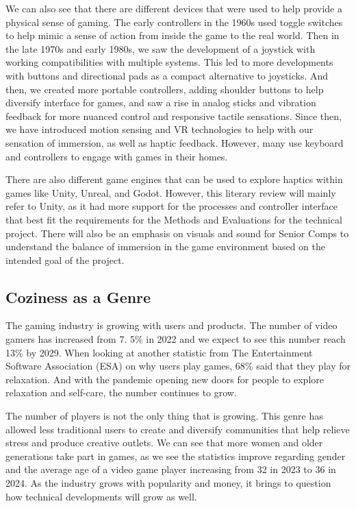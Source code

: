 \documentclass[10pt,twocolumn]{article}
\begin{document}
We can also see that there are different devices that were used to help provide a physical sense of gaming. The early controllers in the 1960s used toggle switches to help mimic a sense of action from inside the game to the real world.\cite{cummings_evolution_2012} Then in the late 1970s and early 1980s, we saw the development of a joystick with working compatibilities with multiple systems. This led to more developments with buttons and directional pads as a compact alternative to joysticks. And then, we created more portable controllers, adding shoulder buttons to help diversify interface for games, and saw a rise in analog sticks and vibration feedback for more nuanced control and responsive tactile sensations. Since then, we have introduced motion sensing and VR technologies to help with our sensation of immersion, as well as haptic feedback. However, many use keyboard and controllers to engage with games in their homes.

There are also different game engines that can be used to explore haptics within games like Unity, Unreal, and Godot. However, this literary review will mainly refer to Unity, as it had more support for the processes and controller interface that best fit the requirements for the Methods and Evaluations for the technical project. There will also be an emphasis on visuals and sound for Senior Comps to understand the balance of immersion in the game environment based on the intended goal of the project.

\subsection{Coziness as a Genre}

The gaming industry is growing with users and products. The number of video gamers has increased from 7. 5\% in 2022 and we expect to see this number reach 13\% by 2029.\cite{kody_2024} When looking at another statistic from The Entertainment Software Association (ESA) on why users play games, 68\% said that they play for relaxation. And with the pandemic opening new doors for people to explore relaxation and self-care, the number continues to grow.

The number of players is not the only thing that is growing. This genre has allowed less traditional users to create and diversify communities that help relieve stress and produce creative outlets. We can see that more women and older generations take part in games, as we see the statistics improve regarding gender and the average age of a video game player increasing from 32 in 2023 to 36 in 2024\cite{kody_2024}. As the industry grows with popularity and money, it brings to question how technical developments will grow as well.
\end{document}
